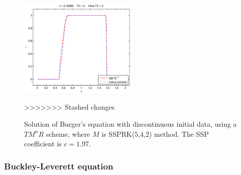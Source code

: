 \begin{figure}[t!]
{      \includegraphics[width=0.5\textwidth]{Pictures/burgers_discont_tvd.eps}}%
    \caption{Solution of Burger's equation with discontinuous initial data, using a $ TM^{n}R $ scheme, where $ M $ is SSPRK($ 5 $,$ 4 $,$ 2 $) method. The SSP coefficient is $ c = 1.97 $.}
>>>>>>> Stashed changes
    \label{fig5.4}
\end{figure}

\subsubsection{Buckley-Leverett equation}\label{subsubsec:B-L}
